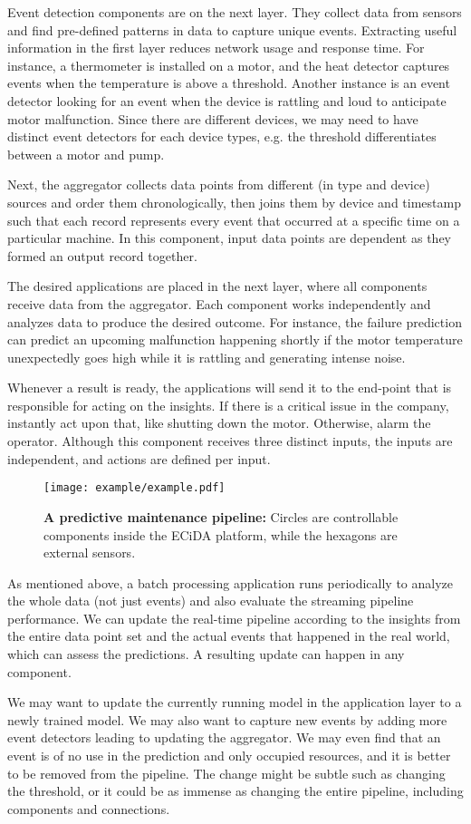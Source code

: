 Event detection components are on the next layer. They collect data from sensors and find pre-defined patterns in data to capture unique events. Extracting useful information in the first layer reduces network usage and response time. For instance, a thermometer is installed on a motor, and the heat detector captures events when the temperature is above a threshold. Another instance is an event detector looking for an event when the device is rattling and loud to anticipate motor malfunction. Since there are different devices, we may need to have distinct event detectors for each device types, e.g. the threshold differentiates between a motor and pump.

Next, the aggregator collects data points from different (in type and device) sources and order them chronologically, then joins them by device and timestamp such that each record represents every event that occurred at a specific time on a particular machine. In this component, input data points are dependent as they formed an output record together. 

The desired applications are placed in the next layer, where all components receive data from the aggregator. Each component works independently and analyzes data to produce the desired outcome. For instance, the failure prediction can predict an upcoming malfunction happening shortly if the motor temperature unexpectedly goes high while it is rattling and generating intense noise. 

Whenever a result is ready, the applications will send it to the end-point that is responsible for acting on the insights. If there is a critical issue in the company, instantly act upon that, like shutting down the motor. Otherwise, alarm the operator. Although this component receives three distinct inputs, the inputs are independent, and actions are defined per input. 

\begin{figure}[ht]
    \centering
    \texttt{[image: example/example.pdf]}
    \caption{\textbf{A predictive maintenance pipeline:} Circles are controllable components inside the ECiDA platform, while the hexagons are external sensors.}
    \label{fig:example}
\end{figure}

As mentioned above, a batch processing application runs periodically to analyze the whole data (not just events) and also evaluate the streaming pipeline performance. We can update the real-time pipeline according to the insights from the entire data point set and the actual events that happened in the real world, which can assess the predictions. A resulting update can happen in any component.

We may want to update the currently running model in the application layer to a newly trained model. We may also want to capture new events by adding more event detectors leading to updating the aggregator. We may even find that an event is of no use in the prediction and only occupied resources, and it is better to be removed from the pipeline. The change might be subtle such as changing the threshold, or it could be as immense as changing the entire pipeline, including components and connections. 
